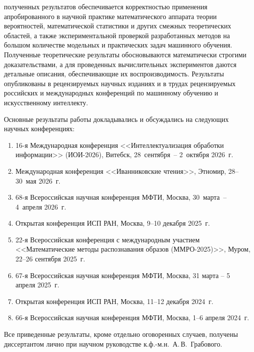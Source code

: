 {\reliability} полученных результатов обеспечивается корректностью
применения апробированного в научной практике математического аппарата теории вероятностей, математической статистики и других смежных теоретических областей, а также экспериментальной проверкой разработанных методов на большом количестве модельных и практических задач машинного обучения. Полученные теоретические результаты обосновываются математически строгими доказательствами, а для проведенных вычислительных экспериментов даются детальные описания, обеспечивающие их воспроизводимость. Результаты опубликованы в рецензируемых научных изданиях и в трудах рецензируемых российских и международных конференций по машинному обучению и искусственному интеллекту.

{\probation} Основные результаты работы докладывались и обсуждались на следующих научных конференциях:
\begin{enumerate}
    \item 16-я Международная конференция
    <<Интеллектуализация обработки информации>> (ИОИ-2026),
    Витебск, 28~сентября~-- 2~октября 2026~г.
    \item Международная конференция <<Иванниковские чтения>>,
    Этномир, 28--30~мая 2026~г.
    \item 68-я Всероссийская научная конференция МФТИ,
    Москва, 30~марта~-- 4~апреля 2026~г.
    \item Открытая конференция ИСП РАН, Москва, 9--10 декабря 2025~г.
    \item 22-я Всероссийская конференция с международным участием
    <<Математические методы распознавания образов (ММРО-2025)>>,
    Муром, 22--26 сентября 2025~г.
    \item 67-я Всероссийская научная конференция МФТИ,
    Москва, 31 марта -- 5 апреля 2025~г.
    \item Открытая конференция ИСП РАН, Москва, 11--12 декабря 2024~г.
    \item 66-я Всероссийская научная конференция МФТИ,
    Москва, 1--6 апреля 2024~г.
\end{enumerate}


{\contribution} Все приведенные результаты, кроме отдельно оговоренных случаев, получены диссертантом лично при научном руководстве к.ф.-м.н.~А.\,В.~Грабового.


